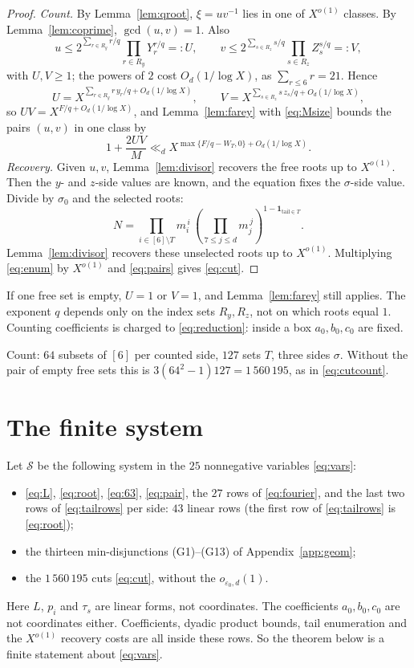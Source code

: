 \documentclass{amsart}
\numberwithin{equation}{section}
\numberwithin{table}{section}
\newcommand{\pos}[1]{\max\{#1,0\}}
\begin{document}
\begin{proof}
\emph{Count.} By Lemma~\ref{lem:qroot}, $\xi=uv^{-1}$ lies in one of
$X^{o(1)}$ classes. By Lemma~\ref{lem:coprime}, $\gcd(u,v)=1$. Also
\[
 u\le2^{\sum_{r\in R_y}r/q}\prod_{r\in R_y}Y_r^{r/q}=:U,
 \qquad
 v\le2^{\sum_{s\in R_z}s/q}\prod_{s\in R_z}Z_s^{s/q}=:V,
\]
with $U,V\ge1$; the powers of $2$ cost $O_d(1/\log X)$, as
$\sum_{r\le6}r=21$. Hence
\[
 U=X^{\sum_{r\in R_y}r\,y_r/q+O_d(1/\log X)},
 \qquad
 V=X^{\sum_{s\in R_z}s\,z_s/q+O_d(1/\log X)},
\]
so $UV=X^{F/q+O_d(1/\log X)}$,
and Lemma~\ref{lem:farey} with \eqref{eq:Msize} bounds the pairs $(u,v)$ in one
class by
\begin{equation}\label{eq:pairs}
 1+\frac{2UV}{M}\ll_dX^{\pos{F/q-W_T}+O_d(1/\log X)} .
\end{equation}
\emph{Recovery.} Given $u,v$, Lemma~\ref{lem:divisor} recovers the free roots up to
$X^{o(1)}$. Then the $y$- and $z$-side values are known, and the equation fixes
the $\sigma$-side value. Divide by $\sigma_0$ and the selected roots:
\[
 N=\prod_{i\in[6]\setminus T}m_i^{\,i}\,
 \left(\prod_{7\le j\le d}m_j^{\,j}\right)^{1-\mathbf 1_{\mathrm{tail}\in T}}.
\]
Lemma~\ref{lem:divisor} recovers these unselected roots up to $X^{o(1)}$.
Multiplying \eqref{eq:enum} by $X^{o(1)}$ and \eqref{eq:pairs} gives
\eqref{eq:cut}.
\end{proof}

If one free set is empty, $U=1$ or $V=1$, and Lemma~\ref{lem:farey} still
applies. The exponent $q$ depends only on the index sets $R_y,R_z$, not on
which roots equal $1$. Counting coefficients is charged to \eqref{eq:reduction}:
inside a box $a_0,b_0,c_0$ are fixed.

Count: $64$ subsets of $[6]$ per counted side, $127$ sets $T$, three sides
$\sigma$. Without the pair of empty free sets this is
$3(64^2-1)127=1\,560\,195$, as in \eqref{eq:cutcount}.

\section{The finite system}\label{sec:cert}

Let $\mathcal S$ be the following system in the $25$ nonnegative variables
\eqref{eq:vars}:
\begin{itemize}
\item \eqref{eq:L}, \eqref{eq:root}, \eqref{eq:63}, \eqref{eq:pair}, the $27$
 rows of \eqref{eq:fourier}, and the last two rows of \eqref{eq:tailrows} per
 side: $43$ linear rows (the first row of \eqref{eq:tailrows} is
 \eqref{eq:root});
\item the thirteen min-disjunctions (G1)--(G13) of Appendix~\ref{app:geom};
\item the $1\,560\,195$ cuts \eqref{eq:cut}, without the
 $o_{\varepsilon_0,d}(1)$.
\end{itemize}
Here $L$, $p_i$ and $\tau_s$ are linear forms, not coordinates. The
coefficients $a_0,b_0,c_0$ are not coordinates either. Coefficients, dyadic
product bounds, tail enumeration and the $X^{o(1)}$ recovery costs are all
inside these rows. So the theorem below is a finite statement about
\eqref{eq:vars}.
\end{document}
